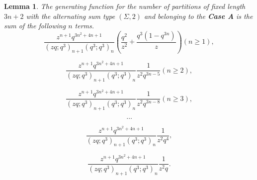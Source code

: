 \documentclass[draft]{amsart}
\numberwithin{equation}{section}
\theoremstyle{plain}
\newtheorem{lemma}[theorem]{Lemma}
\theoremstyle{remark}
\begin{document}
\begin{lemma}\label{Lemma 3.5}%
The generating function  for the number of partitions of fixed length $3n+2$ with the alternating sum type $(\Sigma, 2)$ and belonging to the \textbf{Case A} is the sum of the following $n$ terms.
\begin{equation}\tag{0}\label{3.5-0}
\frac{z^{n+1}q^{3n^{2}+4n+1}}{(zq;q^{3})_{n+1}(q^{3};q^{3})_{n}} \left(\frac{q^{2}}{z^{2}}+\frac{q^{3}(1-q^{3n})}{z}\right)(n\geq 1),
\end{equation}



\begin{equation}\tag{1}\label{3.5-1}
\frac{z^{n+1}q^{3n^{2}+4n+1}}{(zq;q^{3})_{n+1}(q^{3};q^{3})_{n}} \frac{1}{z^{2}q^{3n-5}}(n\geq 2),
\end{equation}



\begin{equation}\tag{2}
\frac{z^{n+1}q^{3n^{2}+4n+1}}{(zq;q^{3})_{n+1}(q^{3};q^{3})_{n}}\frac{1}{z^{2}q^{3n-8}}(n\geq 3),
\end{equation}

\begin{equation*}
\dots
\end{equation*}


\begin{equation}\tag{n-2}
\frac{z^{n+1}q^{3n^{2}+4n+1}}{(zq;q^{3})_{n+1}(q^{3};q^{3})_{n}}\frac{1}{z^{2}q^{4}},
\end{equation}

\begin{equation}\tag{n-1}\label{3.5-n-1}
\frac{z^{n+1}q^{3n^{2}+4n+1}}{(zq;q^{3})_{n+1}(q^{3};q^{3})_{n}}\frac{1}{z^{2}q^{}}.
\end{equation}


\end{lemma}
\end{document}

